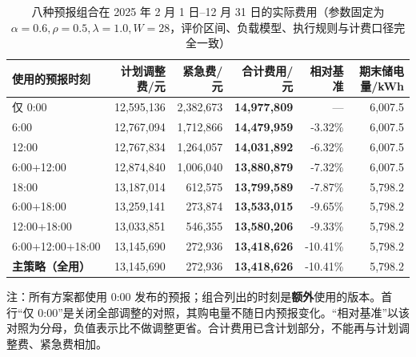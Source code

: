 
\begin{table}[htbp]
  \centering
  \caption{八种预报组合在 2025 年 2 月 1 日--12 月 31 日的实际费用（参数固定为 $\alpha=0.6,\rho=0.5,\lambda=1.0,W=28$，评价区间、负载模型、执行规则与计费口径完全一致）}
  \label{tab:p3-combo}
  \footnotesize
  \begin{tabular}{lrrrrr}
    \toprule
    使用的预报时刻 & 计划调整费/元 & 紧急费/元 & 合计费用/元 & 相对基准 & 期末储电量/kWh \\
    \midrule
    仅 0{:}00 & 12,595,136 & 2,382,673 & \textbf{14,977,809} & --- & 6,007.5 \\
    6{:}00 & 12,767,094 & 1,712,866 & \textbf{14,479,959} & -3.32\% & 6,007.5 \\
    12{:}00 & 12,767,834 & 1,264,057 & \textbf{14,031,892} & -6.32\% & 6,007.5 \\
    6{:}00+12{:}00 & 12,874,840 & 1,006,040 & \textbf{13,880,879} & -7.32\% & 6,007.5 \\
    18{:}00 & 13,187,014 & 612,575 & \textbf{13,799,589} & -7.87\% & 5,798.2 \\
    6{:}00+18{:}00 & 13,259,141 & 273,874 & \textbf{13,533,015} & -9.65\% & 5,798.2 \\
    12{:}00+18{:}00 & 13,033,851 & 546,355 & \textbf{13,580,206} & -9.33\% & 5,798.2 \\
    6{:}00+12{:}00+18{:}00 & 13,145,690 & 272,936 & \textbf{13,418,626} & -10.41\% & 5,798.2 \\
    \midrule
    \textbf{主策略（全用）} & 13,145,690 & 272,936 & \textbf{13,418,626} & -10.41\% & 5,798.2 \\
    \bottomrule
  \end{tabular}
  \par\vspace{2pt}
  \begin{minipage}{.92\textwidth}\footnotesize
    注：所有方案都使用 0:00 发布的预报；组合列出的时刻是\textbf{额外}使用的版本。首行“仅 0:00”是关闭全部调整的对照，其购电量不随日内预报变化。“相对基准”以该对照为分母，负值表示比不做调整更省。合计费用已含计划部分，不能再与计划调整费、紧急费相加。
  \end{minipage}
\end{table}


